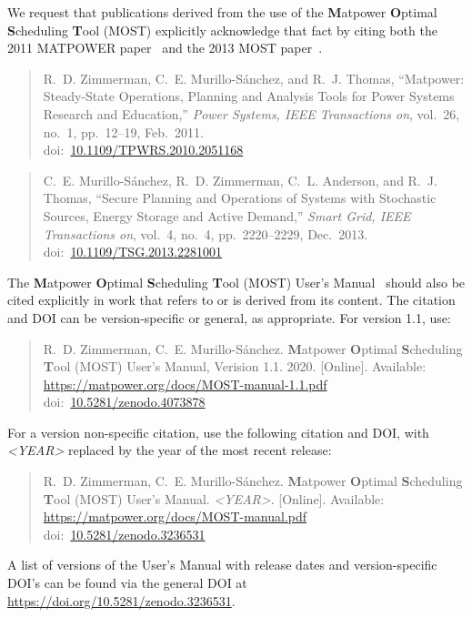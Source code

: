 \documentclass[12pt]{article}
\newcommand{\matpower}[0]{{\sc Matpower}}
\newcommand{\most}[0]{{MOST}}
\newcommand{\mostname}[0]{{{\bf M}{\sc atpower} \textbf{O}ptimal \textbf{S}cheduling \textbf{T}ool}}
\newcommand{\doi}[1]{doi:~\href{https://doi.org/#1}{#1}}
\numberwithin{equation}{section}
\numberwithin{table}{section}
\numberwithin{figure}{section}
\begin{document}
We request that publications derived from the use of the \mostname{} (\most{}) explicitly acknowledge that fact by citing both the 2011 MATPOWER paper~\cite{zimmerman2011} and the 2013 MOST paper~\cite{murillo-sanchez2013a}.

\begin{quote}
\footnotesize
R.~D. Zimmerman, C.~E. Murillo-S{\'a}nchez, and R.~J. Thomas, ``\matpower{}: Steady-State Operations, Planning and Analysis Tools for Power Systems Research and Education,'' \emph{Power Systems, IEEE Transactions on}, vol.~26, no.~1, pp.~12--19, Feb.~2011.\\
\doi{10.1109/TPWRS.2010.2051168}
\end{quote}

\begin{quote}
\footnotesize
C.~E. Murillo-S{\'a}nchez, R.~D. Zimmerman, C.~L. Anderson, and R.~J. Thomas, ``Secure Planning and Operations of Systems with Stochastic Sources, Energy Storage and Active Demand,'' \emph{Smart Grid, IEEE Transactions on}, vol.~4, no.~4, pp.~2220--2229, Dec.~2013.\\
\doi{10.1109/TSG.2013.2281001}
\end{quote}

The \mostname{} (\most) User's Manual~\cite{most_manual} should also be
cited explicitly in work that refers to or is derived from its content.
The citation and DOI can be version-specific or general, as appropriate.
For version 1.1, use:

\begin{quote}
\footnotesize
R.~D. Zimmerman, C.~E. Murillo-S{\'a}nchez. \mostname{} (\most{}) User's Manual, Verision 1.1. 2020. [Online]. Available: \url{https://matpower.org/docs/MOST-manual-1.1.pdf}\\
\doi{10.5281/zenodo.4073878}
\end{quote}
For a version non-specific citation, use the following citation and DOI,
with \emph{\textless{}YEAR\textgreater{}} replaced by the year of the most recent release:

\begin{quote}
\footnotesize
R.~D. Zimmerman, C.~E. Murillo-S{\'a}nchez. \mostname{} (\most{}) User's Manual. \emph{\textless{}YEAR\textgreater{}}.
[Online]. Available: \url{https://matpower.org/docs/MOST-manual.pdf}\\
\doi{10.5281/zenodo.3236531}
\end{quote}
A list of versions of the User's Manual with release dates and
version-specific DOI's can be found via the general DOI at
\url{https://doi.org/10.5281/zenodo.3236531}.
\end{document}
